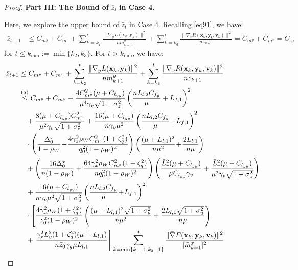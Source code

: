 \documentclass{article}
\theoremstyle{plain}
\theoremstyle{definition}
\theoremstyle{remark}
\begin{document}
\begin{proof}
\textbf{Part III: The Bound of } $\bar{z}_t$ \textbf{ in Case 4.}

Here, we explore the upper bound of $\bar{z}_t$ in Case 4. Recalling \cref{eq91}, we have:
\begin{align}
\bar{z}_{t+1} &\leq C_{m^y} + C_{m^v} + \sum_{k=k_2}^t \frac{\|\nabla_y L(\mathbf{x}_k, \mathbf{y}_k)\|^2}{n\bar{m}^y_{k+1}} + \sum_{k=k_3}^t \frac{\|\nabla_v R(\mathbf{x}_k, \mathbf{y}_k, \mathbf{v}_k)\|^2}{n\bar{z}_{k+1}} = C_{m^y} + C_{m^v} = C_z,\label{eq99}
\end{align}
for $t \leq k_{\min} := \min\{k_2, k_3\}$. For $t > k_{\min}$, we have:
\begin{align}
\bar{z}_{t+1} &\leq C_{m^y} + C_{m^v} + \sum_{k=k_2}^t \frac{\|\nabla_y L(\mathbf{x}_k, \mathbf{y}_k)\|^2}{n\bar{m}^y_{k+1}} + \sum_{k=k_3}^t \frac{\|\nabla_v R(\mathbf{x}_k, \mathbf{y}_k, \mathbf{v}_k)\|^2}{n\bar{z}_{k+1}}  \notag \\
&\overset{(a)}{\leq} C_{m^y} + C_{m^v}  +\frac{4C_{m^y}^2(\mu + C_{l_{yy}})}{\mu^4\gamma_v\sqrt{1+\sigma_z^2}}\left(\frac{nL_{l,2}C_{f_y}}{\mu}+L_{f,1}\right)^2 \nonumber\\
&\quad + \frac{8(\mu + C_{l_{yy}})C_{m^v}^2}{\mu^2\gamma_v\sqrt{1+\sigma_z^2}}+ \frac{16(\mu + C_{l_{yy}})}{n\gamma_v\mu^2}\left(\frac{nL_{l,2}C_{f_y}}{\mu}\!+\!L_{f,1}\right)^2\nonumber\\
&\quad\cdot\left(\frac{\Delta_0^x}{1-\rho_W}\!+\!\frac{4 \gamma_x^2 \rho_WC_{m^x}^2 (1 + \zeta_q^2)}{\bar{q}_0^2(1 - \rho_W)^2} \right)\left(\frac{(\mu+L_{l,1})^2}{n\mu^2 }\!+\!\frac{2L_{l,1}}{n\mu }\right)\notag \\
&\quad+\left(\frac{16\Delta_0^x}{n(1-\rho_W)}+\frac{64\gamma_x^2\rho_WC_{m^x}^2(1+\zeta_q^2)}{n\bar{q}_0^2(1-\rho_W)^2}\right)\left(\frac{ \bar{L}_r^2(\mu + C_{l_{yy}})}{\mu C_{l_{yy}}\gamma_v}+\frac{\bar{L}_r^2(\mu+C_{l_{yy}})}{\mu^2\gamma_v\sqrt{1+\sigma_z^2}}\right) \notag \\
&\quad+\frac{16(\mu + C_{l_{yy}})}{n\gamma_v\mu^2\sqrt{1+\sigma_u^2}}\left(\frac{nL_{l,2}C_{f_y}}{\mu}\!+\!L_{f,1}\right)^2\nonumber\\
&\quad\cdot\left[\frac{4 \gamma_x^2 \rho_W (1 + \zeta_q^2)}{\bar{z}_0^2(1 - \rho_W)^2} \left(\frac{(\mu+L_{l,1})^2\sqrt{1+\sigma_u^2}}{n\mu^2 }+\frac{2L_{l,1}\sqrt{1+\sigma_u^2}}{n\mu }\right)\right.\nonumber\\
&\quad +\left.\frac{\gamma_x^2L_y^2(1+\zeta_q^2)(\mu + L_{l,1})}{n\bar{z}_0\gamma_y \mu L_{l,1}}\right]\sum_{k=\min\{k_1-1,k_2-1\}}^{t} 
 \frac{\| \bar{\nabla} F(\mathbf{x}_{k},\mathbf{y}_{k},\mathbf{v}_{k})\|^2}{[\bar{m}^x_{k+1}]^2}\nonumber\\

\end{align}
\end{proof}
\end{document}
